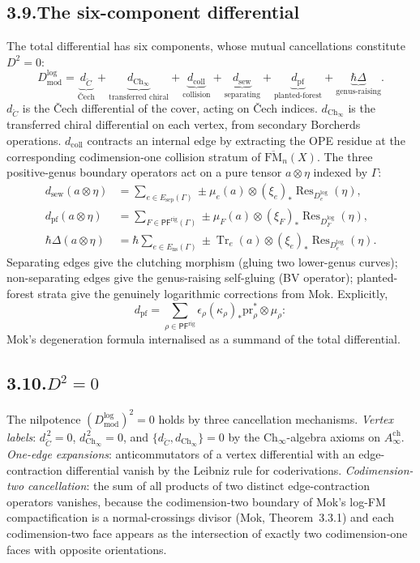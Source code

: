 \documentclass[11pt,reqno]{amsart}
\theoremstyle{definition}
\theoremstyle{remark}
\numberwithin{equation}{section}
\begin{document}
\subsection*{3.9.\enspace The six-component differential}

The total differential has six components, whose mutual cancellations
constitute $D^2=0$:
\[
D^{\log}_{\mathrm{mod}}=\underbrace{d_{\check C}}_{\text{\v Cech}}+\underbrace{d_{\mathrm{Ch}_\infty}}_{\text{transferred chiral}}+\underbrace{d_{\mathrm{coll}}}_{\text{collision}}+\underbrace{d_{\mathrm{sew}}}_{\text{separating}}+\underbrace{d_{\mathrm{pf}}}_{\text{planted-forest}}+\underbrace{\hbar\Delta}_{\text{genus-raising}}.
\]
$d_{\check C}$ is the \v Cech differential of the cover, acting on
\v Cech indices. $d_{\mathrm{Ch}_\infty}$ is the transferred chiral
differential on each vertex, from secondary Borcherds operations.
$d_{\mathrm{coll}}$ contracts an internal edge by extracting the OPE
residue at the corresponding codimension-one collision stratum of
$\overline{\mathrm{FM}}_n(X)$. The three positive-genus boundary
operators act on a pure tensor $a\otimes\eta$ indexed by $\Gamma$:
\begin{align*}
d_{\mathrm{sew}}(a\otimes\eta)&=\sum_{e\in E_{\mathrm{sep}}(\Gamma)}\pm\mu_e(a)\otimes(\xi_e)_*\operatorname{Res}_{D_e^{\log}}(\eta),\\
d_{\mathrm{pf}}(a\otimes\eta)&=\sum_{F\in\mathsf{PF}^{\mathrm{rig}}(\Gamma)}\pm\mu_F(a)\otimes(\xi_F)_*\operatorname{Res}_{D_F^{\log}}(\eta),\\
\hbar\Delta(a\otimes\eta)&=\hbar\sum_{e\in E_{\mathrm{ns}}(\Gamma)}\pm\operatorname{Tr}_e(a)\otimes(\xi_e)_*\operatorname{Res}_{D_e^{\log}}(\eta).
\end{align*}
Separating edges give the clutching morphism (gluing two lower-genus
curves); non-separating edges give the genus-raising self-gluing
(BV operator); planted-forest strata give the genuinely logarithmic
corrections from Mok. Explicitly,
\[
d_{\mathrm{pf}}=\sum_{\rho\in\mathsf{PF}^{\mathrm{rig}}}\epsilon_\rho(\kappa_\rho)_*\mathrm{pr}_\rho^*\otimes\mu_\rho:
\]
Mok's degeneration formula internalised as a summand of the total
differential.

\subsection*{3.10.\enspace $D^2=0$}

The nilpotence $(D^{\log}_{\mathrm{mod}})^2=0$ holds by three
cancellation mechanisms. \emph{Vertex labels}: $d_{\check C}^{\,2}=0$,
$d_{\mathrm{Ch}_\infty}^{\,2}=0$, and
$\{d_{\check C},d_{\mathrm{Ch}_\infty}\}=0$ by the
$\mathrm{Ch}_\infty$-algebra axioms on $A^{\mathrm{ch}}_\infty$.
\emph{One-edge expansions}: anticommutators of a vertex differential
with an edge-contraction differential vanish by the Leibniz rule for
coderivations. \emph{Codimension-two cancellation}: the sum of all
products of two distinct edge-contraction operators vanishes, because
the codimension-two boundary of Mok's log-FM compactification is a
normal-crossings divisor (Mok, Theorem~3.3.1) and each codimension-two
face appears as the intersection of exactly two codimension-one faces
with opposite orientations.
\end{document}
